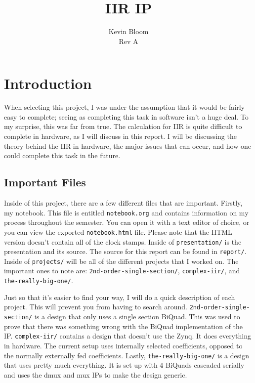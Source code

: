 \documentclass[12pt,a4paper,titlepage]{article}
\begin{document}
\title{IIR IP}
\author{Kevin Bloom \\ Rev A}
\maketitle

\newpage

\tableofcontents

\newpage

\section{Introduction}
When selecting this project, I was under the assumption that it would be fairly
easy to complete; seeing as completing this task in software isn't a huge
deal. To my surprise, this was far from true. The calculation for IIR is quite
difficult to complete in hardware, as I will discuss in this report. I will be
discussing the theory behind the IIR in hardware, the major issues that can
occur, and how one could complete this task in the future.

\subsection{Important Files}
Inside of this project, there are a few different files that are important.
Firstly, my notebook. This file is entitled \texttt{notebook.org} and contains
information on my process throughout the semester. You can open it with a text
editor of choice, or you can view the exported \texttt{notebook.html}
file. Please note that the HTML version doesn't contain all of the clock
stamps. Inside of \texttt{presentation/} is the presentation and its source. The
source for this report can be found in \texttt{report/}. Inside of
\texttt{projects/} will be all of the different projects that I worked on. The
important ones to note are: \texttt{2nd-order-single-section/},
\texttt{complex-iir/}, and \texttt{the-really-big-one/}.

Just so that it's easier to find your way, I will do a quick description of each
project. This will prevent you from having to search
around. \texttt{2nd-order-single-section/} is a design that only uses a single
section BiQuad. This was used to prove that there was something wrong with the
BiQuad implementation of the IP. \texttt{complex-iir/} contains a design that
doesn't use the Zynq. It does everything in hardware. The current setup uses
internally selected coefficients, opposed to the normally externally fed
coefficients. Lastly, \texttt{the-really-big-one/} is a design that uses pretty
much everything. It is set up with 4 BiQuads cascaded serially and uses the dmux
and mux IPs to make the design generic.
\end{document}
